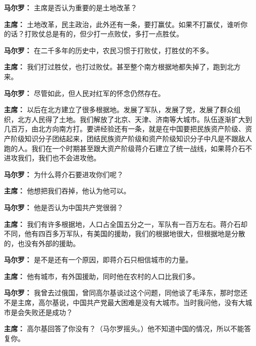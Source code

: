 \begin{duihua}
\item[\textbf{马尔罗：}] 主席是否认为重要的是土地改革？

\item[\textbf{主席：}] 土地改革，民主政治，此外还有一条，要打赢仗。如果不打赢仗，谁听你的话？打败仗总是有的，但少打一点败仗，多打一点胜仗。

\item[\textbf{马尔罗：}] 在二千多年的历史中，农民习惯于打败仗，打胜仗的不多。

\item[\textbf{主席：}] 我们打过胜仗，也打过败仗。甚至整个南方根据地都失掉了，跑到北方来。

\item[\textbf{马尔罗：}] 尽管如此，但人民对红军的怀念仍然存在。

\item[\textbf{主席：}] 以后在北方建立了很多根据地。发展了军队，发展了党，发展了群众组织，北方人民得了土地。我们解放了北京、天津、济南等大城市。队伍逐渐扩大到几百万，由北方向南方打。要讲经验还有一条，就是在中国要把民族资产阶级、资产阶级知识分子团结起来，团结民族资产阶级和资产阶级知识分子中凡是不跟敌人跑的人。我们在一个时期甚至跟大资产阶级蒋介石建立了统一战线，如果蒋介石不进攻我们，我们也不会进攻他。

\item[\textbf{马尔罗：}] 为什么蒋介石要进攻你们呢？

\item[\textbf{主席：}] 他想把我们吞掉，他认为他可以。

\item[\textbf{马尔罗：}] 他是否认为中国共产党很弱？

\item[\textbf{主席：}] 我们有许多根据地，人口占全国五分之一，军队有一百万左右。蒋介石却不同，他有四百多万军队，有美国的援助，我们的根据地很大，但根据地是分散的，也没有外部的援助。

\item[\textbf{马尔罗：}] 是不是还有一个原因，即蒋介石只相信城市的力量。

\item[\textbf{主席：}] 他有城市，有外国援助，同时他在农村的人口比我们多。

\item[\textbf{马尔罗：}] 我曾去过俄国，曾同高尔基谈过这个问题，同他谈了毛泽东，那时您还不是主席，高尔基说，中国共产党最大困难是没有大城市。当时我问他，没有大城市是会失败还是成功？

\item[\textbf{主席：}] 高尔基回答了你没有？（马尔罗摇头。）他不知道中国的情况，所以不能答复你。


\end{duihua}
